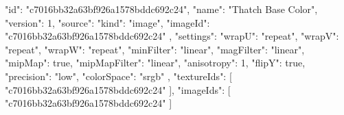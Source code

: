{
  "id": "c7016bb32a63bf926a1578bddc692c24",
  "name": "Thatch Base Color",
  "version": 1,
  "source": {
    "kind": "image",
    "imageId": "c7016bb32a63bf926a1578bddc692c24"
  },
  "settings": {
    "wrapU": "repeat",
    "wrapV": "repeat",
    "wrapW": "repeat",
    "minFilter": "linear",
    "magFilter": "linear",
    "mipMap": true,
    "mipMapFilter": "linear",
    "anisotropy": 1,
    "flipY": true,
    "precision": "low",
    "colorSpace": "srgb"
  },
  "textureIds": [
    "c7016bb32a63bf926a1578bddc692c24"
  ],
  "imageIds": [
    "c7016bb32a63bf926a1578bddc692c24"
  ]
}
